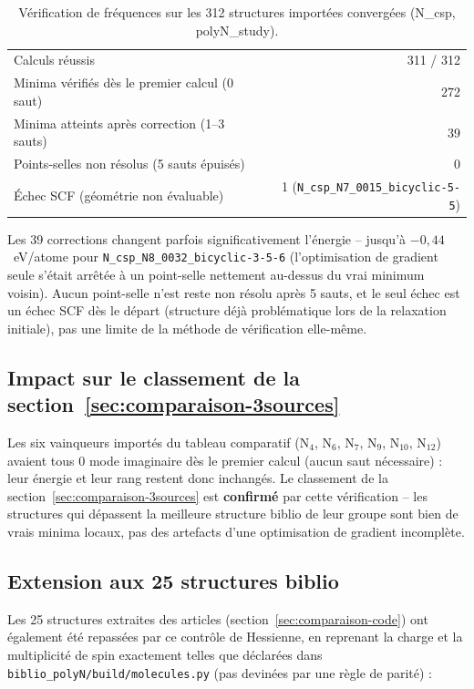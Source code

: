 \documentclass[11pt,a4paper]{article}
\begin{document}
\begin{table}[H]
\centering
\begin{tabular}{lr}
\toprule
Calculs r\'eussis & 311 / 312 \\
Minima v\'erifi\'es d\`es le premier calcul (0 saut) & 272 \\
Minima atteints apr\`es correction (1--3 sauts) & 39 \\
Points-selles non r\'esolus (5 sauts \'epuis\'es) & 0 \\
\'Echec SCF (g\'eom\'etrie non \'evaluable) & 1 (\texttt{N\_csp\_N7\_0015\_bicyclic-5-5}) \\
\bottomrule
\end{tabular}
\caption{V\'erification de fr\'equences sur les 312 structures import\'ees
convergées (N\_csp, polyN\_study).}
\label{tab:freq-import}
\end{table}

Les 39 corrections changent parfois significativement l'\'energie -- jusqu'\`a
$-0{,}44$~eV/atome pour \texttt{N\_csp\_N8\_0032\_bicyclic-3-5-6}
(l'optimisation de gradient seule s'\'etait arr\^et\'ee \`a un point-selle
nettement au-dessus du vrai minimum voisin). Aucun point-selle n'est reste
non r\'esolu apr\`es 5 sauts, et le seul \'echec est un \'echec SCF d\`es le
d\'epart (structure d\'ej\`a probl\'ematique lors de la relaxation
initiale), pas une limite de la m\'ethode de v\'erification elle-m\^eme.

\subsection{Impact sur le classement de la section~\ref{sec:comparaison-3sources}}

Les six vainqueurs import\'es du tableau comparatif (N$_4$, N$_6$, N$_7$,
N$_9$, N$_{10}$, N$_{12}$) avaient tous 0 mode imaginaire d\`es le premier
calcul (aucun saut n\'ecessaire) : leur \'energie et leur rang restent donc
inchang\'es. Le classement de la section~\ref{sec:comparaison-3sources} est
\textbf{confirm\'e} par cette v\'erification -- les structures qui
d\'epassent la meilleure structure biblio de leur groupe sont bien de vrais
minima locaux, pas des artefacts d'une optimisation de gradient incompl\`ete.

\subsection{Extension aux 25 structures biblio}

Les 25 structures extraites des articles (section~\ref{sec:comparaison-code})
ont \'egalement \'et\'e repass\'ees par ce contr\^ole de Hessienne, en
reprenant la charge et la multiplicit\'e de spin exactement telles que
d\'eclar\'ees dans \texttt{biblio\_polyN/build/molecules.py} (pas devin\'ees
par une r\`egle de parit\'e) :
\end{document}
